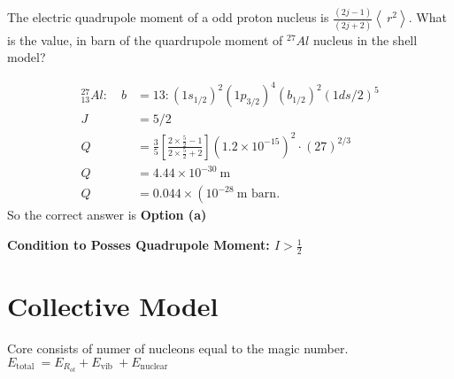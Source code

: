 \begin{exercise}
	The electric quadrupole moment of a odd proton nucleus is $\frac{(2 j-1)}{(2 j+2)}\left\langle\ r^{2}\right\rangle$. What is the value, in barn of the quardrupole moment of ${}^{27}Al$ nucleus in the shell model?
\end{exercise}
\begin{answer}
	\begin{align*}
	{ }_{13}^{27} A l: \quad b&=13:\left(1 s_{1 / 2}\right)^{2}\left(1 p_{3 / 2}\right)^{4}\left(b_{1 / 2}\right)^{2}(1 d s / 2)^{5}\\
	J&=5 / 2\\
	Q&=\frac{3}{5}\left[\frac{2 \times \frac{5}{2}-1}{2 \times \frac{5}{2}+2}\right]\left(1.2 \times 10^{-15}\right)^{2} \cdot(27)^{2 / 3}\\
	Q&=4.44 \times 10^{-30} \mathrm{~m}\\
	Q&=0.044 \times\left(10^{-28} \mathrm{~m}\right. \text { barn. }
	\end{align*}
	So the correct answer is \textbf{Option (a)}
\end{answer}
\textbf{Condition to Posses Quadrupole Moment: $I>\frac{1}{2}$}
\section{Collective Model}
Core consists of numer of nucleons equal to the magic number.\\
$E_{\text {total }}=E_{R_{o t}}+E_{\text {vib }}+E_{\text {nuclear }}$\\
